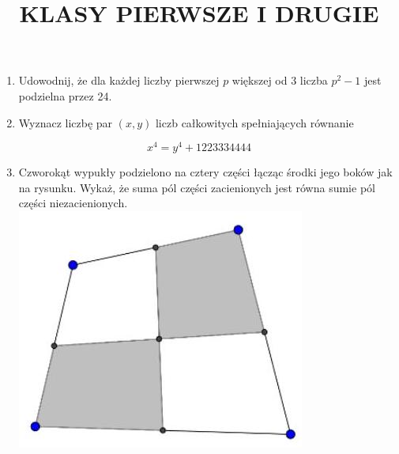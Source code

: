 \documentclass[10pt]{article}
\title{KLASY PIERWSZE I DRUGIE }
\author{}
\date{}
\begin{document}
\maketitle
\begin{enumerate}
  \item Udowodnij, że dla każdej liczby pierwszej \(p\) większej od 3 liczba \(p^{2}-1\) jest podzielna przez 24.
  \item Wyznacz liczbę par \((x, y)\) liczb całkowitych spełniających równanie
\end{enumerate}

\[
x^{4}=y^{4}+1223334444
\]

\begin{enumerate}
  \setcounter{enumi}{2}
  \item Czworokąt wypukły podzielono na cztery części łącząc środki jego boków jak na rysunku. Wykaż, że suma pól części zacienionych jest równa sumie pól części niezacienionych.\\
\includegraphics[max width=\textwidth, center]{2024_11_21_a2b9e49dabde1310792eg-1(1)}
\end{enumerate}
\end{document}
